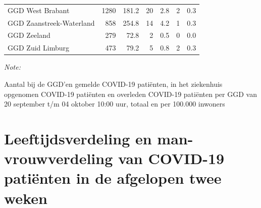 \documentclass[
  english,
  man,floatsintext]{apa6}
\begin{document}
\begin{table}[H]
\begin{threeparttable}
\begin{tabular}{lrrrrrr}
GGD West Brabant & 1280 & 181.2 & 20 & 2.8 & 2 & 0.3\\
GGD Zaanstreek-Waterland & 858 & 254.8 & 14 & 4.2 & 1 & 0.3\\
GGD Zeeland & 279 & 72.8 & 2 & 0.5 & 0 & 0.0\\
GGD Zuid Limburg & 473 & 79.2 & 5 & 0.8 & 2 & 0.3\\
\bottomrule
\end{tabular}
\begin{tablenotes}
\item \textit{Note: } 
\item Aantal bij de GGD’en gemelde COVID-19 patiënten, in het ziekenhuis opgenomen COVID-19 patiënten en overleden COVID-19 patiënten per GGD van 20 september t/m 04 oktober 10:00 uur, totaal en per 100.000 inwoners
\end{tablenotes}
\end{threeparttable}
\endgroup{}
\end{table}

\newpage

\hypertarget{leeftijdsverdeling-en-man-vrouwverdeling-van-covid-19-patiuxebnten-in-de-afgelopen-twee-weken}{%
\section{Leeftijdsverdeling en man-vrouwverdeling van COVID-19 patiënten in de afgelopen twee weken}\label{leeftijdsverdeling-en-man-vrouwverdeling-van-covid-19-patiuxebnten-in-de-afgelopen-twee-weken}}
\end{document}
